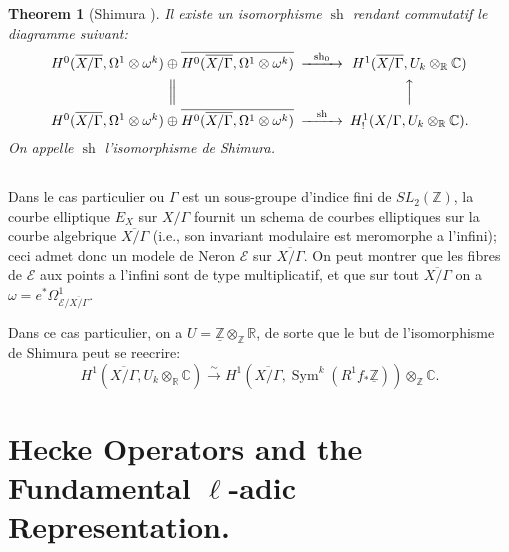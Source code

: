 \documentclass[11pt,reqno]{amsart}
\theoremstyle{plain}
\newtheorem{theorem}{Theorem}[section]
\theoremstyle{remark}
\DeclareMathOperator{\Sym}{Sym}
\newcommand{\Z}{\mathbb{Z}}
\newcommand{\R}{\mathbb{R}}
\newcommand{\C}{\mathbb{C}}
\newcommand{\isom}{\xrightarrow{\sim}}
\numberwithin{equation}{section}
\begin{document}
\begin{theorem}[Shimura \cite{Shimura}]\label{thm:shimura}
Il existe un isomorphisme $\operatorname{sh}$ rendant commutatif le diagramme suivant:
\[
\begin{CD}
H^0(\overline{X/\Gamma}, \Omega^1 \otimes \omega^k) \oplus \overline{H^0(\overline{X/\Gamma}, \Omega^1 \otimes \omega^k)} @>{\operatorname{sh}_0}>> H^1(\overline{X/\Gamma}, U_k \otimes_\R \C) \\
@| @AAA \\
H^0(\overline{X/\Gamma}, \Omega^1 \otimes \omega^k) \oplus \overline{H^0(\overline{X/\Gamma}, \Omega^1 \otimes \omega^k)} @>{\operatorname{sh}}>> H^1_!(X/\Gamma, U_k \otimes_\R \C).
\end{CD}
\]
On appelle $\operatorname{sh}$ l'isomorphisme de Shimura.
\end{theorem}

\subsection{}\label{subsec:2.11}

Dans le cas particulier ou $\Gamma$ est un sous-groupe d'indice fini de $SL_2(\Z)$, la courbe elliptique $E_X$ sur $X/\Gamma$ fournit un schema de courbes elliptiques sur la courbe algebrique $\overline{X/\Gamma}$ (i.e., son invariant modulaire est meromorphe a l'infini); ceci admet donc un modele de Neron $\mathcal{E}$ sur $\overline{X/\Gamma}$. On peut montrer que les fibres de $\mathcal{E}$ aux points a l'infini sont de type multiplicatif, et que sur tout $\overline{X/\Gamma}$ on a $\omega = e^*\Omega^1_{\mathcal{E}/\overline{X/\Gamma}}$.

Dans ce cas particulier, on a $U = \underline{\Z} \otimes_\Z \R$, de sorte que le but de l'isomorphisme de Shimura peut se reecrire:
\[
H^1(\overline{X/\Gamma}, U_k \otimes_\R \C) \isom H^1(\overline{X/\Gamma}, \Sym^k(R^1f_*\underline{\Z})) \otimes_\Z \C.
\]


\section{Hecke Operators and the Fundamental $\ell$-adic Representation.}\label{sec:3}

\subsection{}\label{subsec:3.1}
\end{document}
